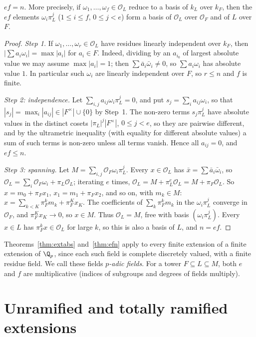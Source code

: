\begin{theorem}\label{thm:efn}
$ef=n$. More precisely, if $\omega_1,\dots,\omega_f\in\mathcal O_L$ reduce to a basis of $k_L$ over $k_F$, then the $ef$
elements $\omega_i\pi_L^j$ ($1\le i\le f$, $0\le j<e$) form a basis of $\mathcal O_L$ over $\mathcal O_F$ and of $L$ over $F$.
\end{theorem}
\begin{proof}
\emph{Step 1.} If $\omega_1,\dots,\omega_r\in\mathcal O_L$ have residues linearly independent over $k_F$, then $|\sum a_i\omega_i|=
\max|a_i|$ for $a_i\in F$. Indeed, dividing by an $a_{i_0}$ of largest absolute value we may assume $\max|a_i|=1$; then
$\sum\bar a_i\bar\omega_i\ne0$, so $\sum a_i\omega_i$ has absolute value $1$. In particular such $\omega_i$ are linearly
independent over $F$, so $r\le n$ and $f$ is finite.

\emph{Step 2: independence.} Let $\sum_{i,j}a_{ij}\omega_i\pi_L^j=0$, and put $s_j=\sum_ia_{ij}\omega_i$, so that
$|s_j|=\max_i|a_{ij}|\in|F^\times|\cup\{0\}$ by Step~1. The non-zero terms $s_j\pi_L^j$ have absolute values in the distinct
cosets $|\pi_L|^j|F^\times|$, $0\le j<e$, so they are pairwise different, and by the ultrametric inequality (with equality for
different absolute values) a sum of such terms is non-zero unless all terms vanish. Hence all $a_{ij}=0$, and $ef\le n$.

\emph{Step 3: spanning.} Let $M=\sum_{i,j}\mathcal O_F\omega_i\pi_L^j$. Every $x\in\mathcal O_L$ has $\bar x=\sum\bar a_i
\bar\omega_i$, so $\mathcal O_L=\sum_i\mathcal O_F\omega_i+\pi_L\mathcal O_L$; iterating $e$ times, $\mathcal O_L=M+\pi_L^e\mathcal
O_L=M+\pi_F\mathcal O_L$. So $x=m_0+\pi_Fx_1$, $x_1=m_1+\pi_Fx_2$, and so on, with $m_k\in M$: $x=\sum_{k<K}\pi_F^km_k+\pi_F^Kx_K$.
The coefficients of $\sum_k\pi_F^km_k$ in the $\omega_i\pi_L^j$ converge in $\mathcal O_F$, and $\pi_F^Kx_K\to0$, so $x\in M$.
Thus $\mathcal O_L=M$, free with basis $(\omega_i\pi_L^j)$. Every $x\in L$ has $\pi_F^kx\in\mathcal O_L$ for large $k$, so this is
also a basis of $L$, and $n=ef$.
\end{proof}

Theorems~\ref{thm:extabs} and~\ref{thm:efn} apply to every finite extension of a finite extension of $\Q_p$, since each such
field is complete discretely valued, with a finite residue field. We call these fields \emph{$p$-adic fields}. For a tower
$F\subseteq L\subseteq M$, both $e$ and $f$ are multiplicative (indices of subgroups and degrees of fields multiply).

\section{Unramified and totally ramified extensions}

